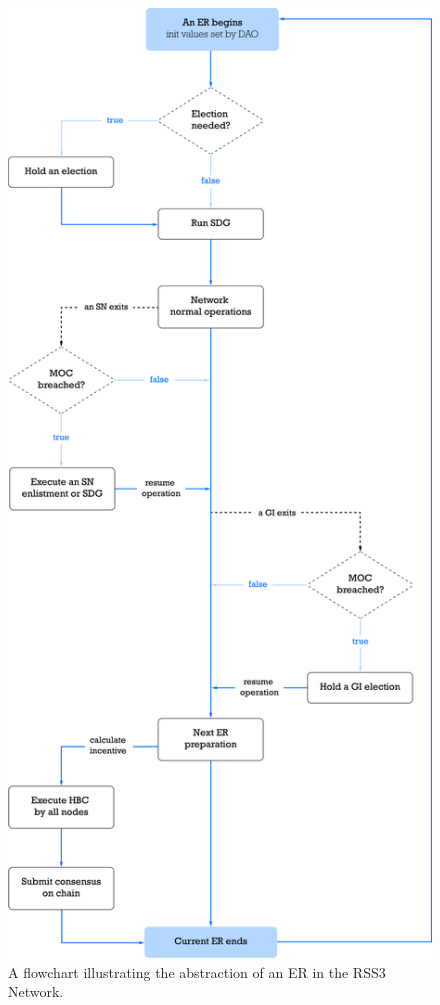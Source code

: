 {
\begin{figure}[tb!]
    \centering
    \includegraphics[width=\columnwidth]{figures/flow.jpg}
    \caption{A flowchart illustrating the abstraction of an ER in the RSS3 Network.}
    \label{fig:flow}
\end{figure}
}